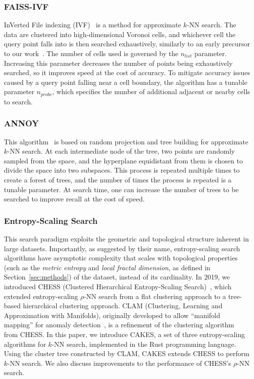 \subsubsection{FAISS-IVF}
\label{sec:introduction:related-works:faiss-ivf}

InVerted File indexing (IVF)~\cite{faissivf, sacks1987multikey, kent1990signature} is a method for approximate $k$-NN search. 
The data are clustered into high-dimensional Voronoi cells, and whichever cell the query point falls into is then searched exhaustively, similarly to an early precursor to our work~\cite{yu2015entropy}.
The number of cells used is governed by the $n_{list}$ parameter. 
Increasing this parameter decreases the number of points being exhaustively searched, so it improves speed at the cost of accuracy.
To mitigate accuracy issues caused by a query point falling near a cell boundary, the algorithm has a tunable parameter $n_{probe}$, which specifies the number of additional adjacent or nearby cells to search.


\subsubsection{ANNOY}
\label{sec:introduction:related-works:annoy}

This algorithm~\cite{annoy} is based on random projection and tree building for approximate $k$-NN search.
At each intermediate node of the tree, two points are randomly sampled from the space, and the hyperplane equidistant from them is chosen to divide the space into two subspaces.
This process is repeated multiple times to create a forest of trees, and the number of times the process is repeated is a tunable parameter.
At search time, one can increase the number of trees to be searched to improve recall at the cost of speed.

\subsubsection{Entropy-Scaling Search}
\label{sec:introduction:related-works:entropy-scaling-search}

This search paradigm exploits the geometric and topological structure inherent in large datasets.
Importantly, as suggested by their name, entropy-scaling search algorithms have asymptotic complexity that scales with topological properties (such as the \textit{metric entropy} and \textit{local fractal dimension}, as defined in Section~\ref{sec:methods}) of the dataset, instead of its cardinality.
In 2019, we introduced CHESS (Clustered Hierarchical Entropy-Scaling Search)~\cite{ishaq2019clustered}, which extended entropy-scaling $\rho$-NN search from a flat clustering approach to a tree-based hierarchical clustering approach.
CLAM (Clustering, Learning and Approximation with Manifolds), originally developed to allow ``manifold mapping'' for anomaly detection~\cite{ishaq2021clustered}, is a refinement of the clustering algorithm from CHESS.
In this paper, we introduce CAKES, a set of three entropy-scaling algorithms for $k$-NN search, implemented in the Rust programming language. 
Using the cluster tree constructed by CLAM, CAKES extends CHESS to perform $k$-NN search. We also discuss improvements to the performance of CHESS's $\rho$-NN search.
